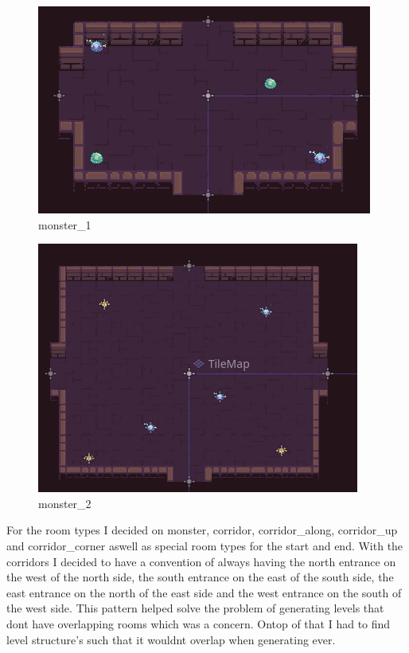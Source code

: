 \documentclass{article}
\begin{document}
        \begin{multicols}{2}
        \begin{figure}[H]
                \centering
                \includegraphics[width = \columnwidth]{images/development/Monster_1.PNG}
                \caption{monster\_1}
        \end{figure}
        \begin{figure}[H]
                \centering
                \includegraphics[width = 0.8\columnwidth]{images/development/Monster_2.PNG}
                \caption{monster\_2}
        \end{figure}                     
        \end{multicols}
        For the room types I decided on monster, corridor, corridor\_along, corridor\_up and corridor\_corner aswell as special room types for the start and end. With the corridors I decided to have a convention of always having the north entrance on the west of the north side, the south entrance on the east of the south side, the east entrance on the north of the east side and the west entrance on the south of the west side. This pattern helped solve the problem of generating levels that dont have overlapping rooms which was a concern. Ontop of that I had to find level structure's such that it wouldnt overlap when generating ever.\\
\end{document}
